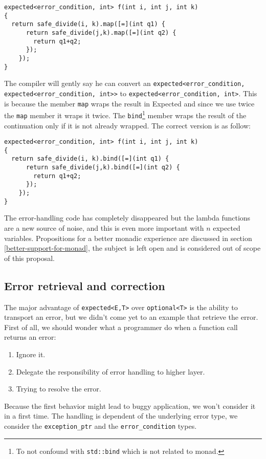 \documentclass[a4paper,10pt]{article}
\newcommand{\cpp}[1]{\lstinline{#1}}
\begin{document}
\begin{lstlisting}
expected<error_condition, int> f(int i, int j, int k)
{
  return safe_divide(i, k).map([=](int q1) {
      return safe_divide(j,k).map([=](int q2) {
        return q1+q2;
      });
    });
}
\end{lstlisting}

The compiler will gently say he can convert an \cpp{expected<error_condition, expected<error_condition, int>>} to \cpp{expected<error_condition, int>}. This is because the member \cpp{map} wraps the result in Expected and since we use twice the \cpp{map} member it wraps it twice. The \cpp{bind}\footnote{To not confound with \cpp{std::bind} which is not related to monad.} member wraps the result of the continuation only if it is not already wrapped. The correct version is as follow:

\begin{lstlisting}
expected<error_condition, int> f(int i, int j, int k)
{
  return safe_divide(i, k).bind([=](int q1) {
      return safe_divide(j,k).bind([=](int q2) {
        return q1+q2;
      });
    });
}
\end{lstlisting}

The error-handling code has completely disappeared but the lambda functions are a new source of noise, and this is even more important with $n$ expected variables. Propositions for a better monadic experience are discussed in section \ref{better-support-for-monad}, the subject is left open and is considered out of scope of this proposal.

\subsection{Error retrieval and correction}

The major advantage of \cpp{expected<E,T>} over \cpp{optional<T>} is the ability to transport an error, but we didn't come yet to an example that retrieve the error. First of all, we should wonder what a programmer do when a function call returns an error:

\begin{enumerate}
 \item Ignore it.
 \item Delegate the responsibility of error handling to higher layer.
 \item Trying to resolve the error.
\end{enumerate}

Because the first behavior might lead to buggy application, we won't consider it in a first time. The handling is dependent of the underlying error type, we consider the \cpp{exception_ptr} and the \cpp{error_condition} types.
\end{document}
